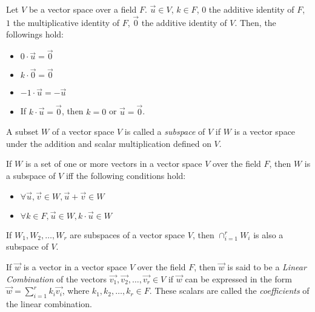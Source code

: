 \documentclass{report}
\begin{document}
		\begin{thm}
			Let $V$ be a vector space over a field $F$. $\vec{u} \in V$, $k \in F$, $0$ the additive identity of $F$, $1$ the multiplicative identity of $F$, $\vec{0}$ the additive identity of $V$. Then, the followings hold:
			\begin{itemize}
				\item $0 \cdot \vec{u} = \vec{0}$
				\item $k \cdot \vec{0} = \vec{0}$
				\item $-1 \cdot \vec{u} = -\vec{u}$
				\item If $k \cdot \vec{u} = \vec{0}$, then $k=0$ or $\vec{u}=\vec{0}$.
			\end{itemize}
		\end{thm}
		
		\begin{defn}
			A subset $W$ of a vector space $V$ is called a \emph{subspace} of $V$ if $W$ is a vector space under the addition and scalar multiplication defined on $V$.
		\end{defn}

		\begin{thm}
			If $W$ is a set of one or more vectors in a vector space $V$ over the field $F$, then $W$ is a subspace of $V$ iff the following conditions hold:
			\begin{itemize}
				\item $\forall \vec{u}, \vec{v} \in W, \vec{u}+\vec{v} \in W$
				\item $\forall k \in F, \vec{u} \in W, k \cdot \vec{u} \in W$
			\end{itemize}
		\end{thm}
	
		\begin{thm}
			If $W_1, W_2, \dots , W_r$ are subspaces of a vector space $V$, then $\cap_{i=1}^{r}W_i$ is also a subspace of $V$.
		\end{thm}
	
		\begin{defn} \label{def_linear_combination_vector}
			If $\vec{w}$ is a vector in a vector space $V$ over the field $F$, then $\vec{w}$ is said to be a \emph{Linear Combination} of the vectors $\vec{v_1}, \vec{v_2}, \dots, \vec{v_r} \in V$ if $\vec{w}$ can be expressed in the form $\vec{w}=\sum_{i=1}^{r}k_i\vec{v_i}$, where $k_1, k_2, \dots, k_r \in F$. These scalars are called the \emph{coefficients} of the linear combination.
		\end{defn}
	
\end{document}
